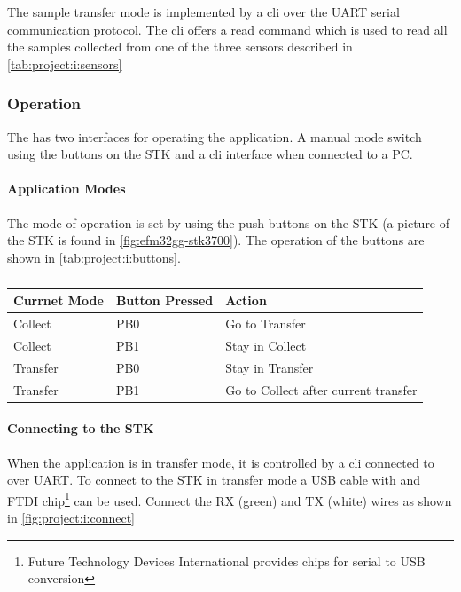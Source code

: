 The sample transfer mode is implemented by a \gls{cli} over the UART serial communication protocol.
The \gls{cli} offers a read command which is used to read all the samples collected from one of the three sensors described in \autoref{tab:project:i:sensors}

\subsubsection{Operation}

The {\tracker} has two interfaces for operating the application.
A manual mode switch using the buttons on the STK and a \gls{cli} interface when connected to a PC.

\paragraph{Application Modes}
The mode of operation is set by using the push buttons on the STK (a picture of the STK is found in \autoref{fig:efm32gg-stk3700}).
The operation of the buttons are shown in \autoref{tab:project:i:buttons}.

\begin{table}[H]
  \centering
  \begin{tabular}{l|l|l}
    \textbf{Currnet Mode} & \textbf{Button Pressed} & \textbf{Action} \\
    \hline
    Collect & PB0 & Go to Transfer \\
    Collect & PB1 & Stay in Collect \\
    Transfer & PB0 & Stay in Transfer \\
    Transfer & PB1 & Go to Collect after current transfer \\
    \hline
  \end{tabular}
  \caption{}
  \label{tab:project:i:buttons}
\end{table}

\paragraph{Connecting to the STK}
When the application is in transfer mode, it is controlled by a \gls{cli} connected to over UART.
To connect to the STK in transfer mode a USB cable with and FTDI chip\footnote{Future Technology Devices International provides chips for serial to USB conversion} can be used.
Connect the RX (green) and TX (white) wires as shown in \autoref{fig:project:i:connect}

